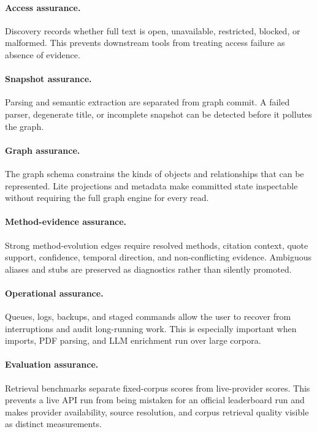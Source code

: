 \documentclass[11pt]{article}
\begin{document}
\paragraph{Access assurance.}
Discovery records whether full text is open, unavailable, restricted, blocked, or malformed. This prevents downstream tools from treating access failure as absence of evidence.

\paragraph{Snapshot assurance.}
Parsing and semantic extraction are separated from graph commit. A failed parser, degenerate title, or incomplete snapshot can be detected before it pollutes the graph.

\paragraph{Graph assurance.}
The graph schema constrains the kinds of objects and relationships that can be represented. Lite projections and metadata make committed state inspectable without requiring the full graph engine for every read.

\paragraph{Method-evidence assurance.}
Strong method-evolution edges require resolved methods, citation context, quote support, confidence, temporal direction, and non-conflicting evidence. Ambiguous aliases and stubs are preserved as diagnostics rather than silently promoted.

\paragraph{Operational assurance.}
Queues, logs, backups, and staged commands allow the user to recover from interruptions and audit long-running work. This is especially important when imports, PDF parsing, and LLM enrichment run over large corpora.

\paragraph{Evaluation assurance.}
Retrieval benchmarks separate fixed-corpus scores from live-provider scores. This prevents a live API run from being mistaken for an official leaderboard run and makes provider availability, source resolution, and corpus retrieval quality visible as distinct measurements.
\end{document}
